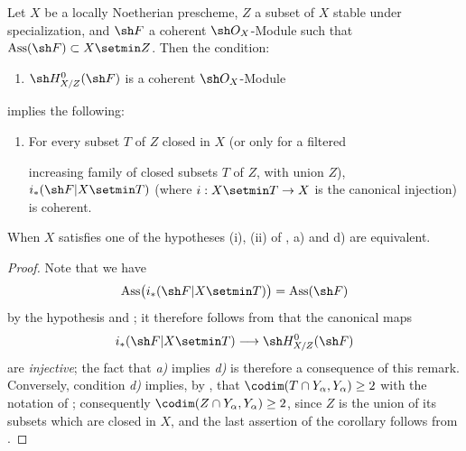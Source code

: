 \begin{corollary}[5.11.5]
\label{IV.5.11.5}
Let $X$ be a locally Noetherian prescheme, $Z$ a subset
of $X$ stable under specialization, and $\sh F$ a coherent
$\sh O_X$-Module such that
$\operatorname{Ass}(\sh F)\subset X\setmin Z$.  Then the condition:
\begin{enumerate}[{\rm a)}]
  \item $\sh H^0_{X/Z}(\sh F)$ is a coherent
  $\sh O_X$-Module
\end{enumerate}
implies the following:
\begin{enumerate}
  \item[{\rm d)}] For every subset $T$ of $Z$ closed in $X$
  \textup{(or only for a filtered}


  increasing family \textup{of closed subsets $T$ of $Z$, with union
  $Z$)}, $i_*(\sh F|X\setmin T)$ \textup{(}where
  $i:X\setmin T\to X$ is the canonical injection\textup{)} is coherent.
\end{enumerate}
When $X$ satisfies one of the hypotheses \textup{(i), (ii)} of
, \textup{a)} and \textup{d)} are equivalent.
\end{corollary}

\begin{proof}
Note that we have
\[
  \operatorname{Ass}\bigl(i_*(\sh F|X\setmin T)\bigr)
  =\operatorname{Ass}(\sh F)
\]
by the hypothesis and ; it therefore follows from
 that the canonical maps
\[
  i_*(\sh F|X\setmin T)\longrightarrow\sh H^0_{X/Z}(\sh F)
\]
are \emph{injective}; the fact that \emph{a)} implies \emph{d)} is
therefore a consequence of this remark.  Conversely, condition
\emph{d)} implies, by , that
$\codim(T\cap Y_\alpha,Y_\alpha)\geq2$ with the notation of
; consequently
$\codim(Z\cap Y_\alpha,Y_\alpha)\geq2$, since $Z$ is the union of
its subsets which are closed in $X$, and the last assertion of the
corollary follows from .
\end{proof}

